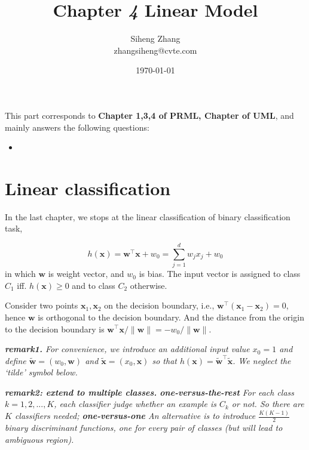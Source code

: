 \documentclass{article}
\author{Siheng Zhang\\zhangsiheng@cvte.com}
\title{Chapter \textbf{\textit{4}} Linear Model}
\date{\today}
\begin{document}
\maketitle  

This part corresponds to \textbf{Chapter 1,3,4 of PRML, Chapter of UML}, and mainly answers the following questions:

\begin{itemize}
\item 
\end{itemize}

\tableofcontents
\newpage

\section{Linear classification}

	In the last chapter, we stops at the linear classification of binary classification task,
	
	\begin{equation}
	h(\mathbf{x})=\mathbf{w}^\top \mathbf{x} + w_0 = \sum_{j=1}^d w_j x_j + w_0
	\label{eq:linear}
	\end{equation}
in which $\mathbf{w}$ is weight vector, and $w_0$ is bias. The input vector is assigned to class $C_1$ iff. $h(\mathbf{x})\geq 0$ and to class $C_2$ otherwise.

	Consider two points $\mathbf{x}_1,\mathbf{x}_2$ on the decision boundary, i.e., $\mathbf{w}^\top (\mathbf{x}_1 - \mathbf{x}_2) = 0$, hence $\mathbf{w}$ is orthogonal to the decision boundary. And the distance from the origin to the decision boundary is $\mathbf{w}^\top \mathbf{x} / \|\mathbf{w}\|=-w_0/\|\mathbf{w}\|$.
	
	\begin{framed}
	\begin{scriptsize}
	\begin{spacing}{1.2}
	\noindent\textit{\textbf{remark1.} For convenience, we introduce an additional input value $x_0 = 1$ and define $\tilde{\mathbf{w}} = (w_0, \mathbf{w})$ and $\tilde{\mathbf{x}} = (x_0, \mathbf{x})$ so that $h(\mathbf{x}) = \tilde{\mathbf{w}}^\top \tilde{\mathbf{x}}$. We neglect the `tilde' symbol below.}
	
	\noindent\textit{\textbf{remark2: extend to multiple classes.}  \textbf{one-versus-the-rest} For each class $k=1,2,...,K$, each classifier judge whether an example is $C_k$ or not. So there are $K$ classifiers needed;  \textbf{one-versus-one} An alternative is to introduce $\frac{K(K-1)}{2}$ binary discriminant functions, one for every pair of classes (but will lead to ambiguous region).}
	\end{spacing}
	\end{scriptsize}
	\end{framed}
	
\end{document}
